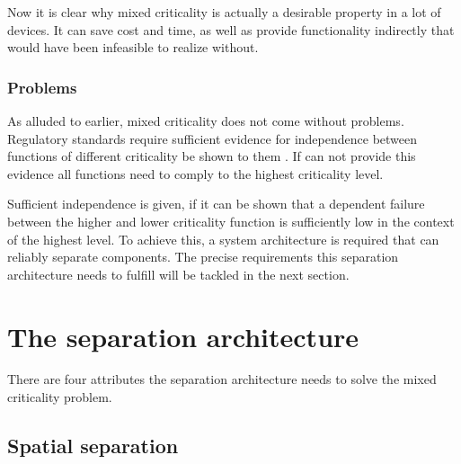 Now it is clear why mixed criticality is actually a desirable property in a lot of devices. It can save cost and time, as well as provide functionality indirectly that would have been infeasible to realize without.
\subsubsection{Problems}
As alluded to earlier, mixed criticality does not come without problems. Regulatory standards require sufficient evidence for independence between functions of different criticality be shown to them \cite{IEC.2010-1}\cite{IEC.2010-2}. If \mfg{} can not provide this evidence all functions need to comply to the highest criticality level.

Sufficient independence is given, if it can be shown that a dependent failure between the higher and lower criticality function is sufficiently low in the context of the highest level.
To achieve this, a system architecture is required that can reliably separate components. The precise requirements this separation architecture needs to fulfill will be tackled in the next section.


\section{The separation architecture} \label{separation-arch}
There are four attributes the separation architecture needs to solve the mixed criticality problem.
\subsection{Spatial separation}

